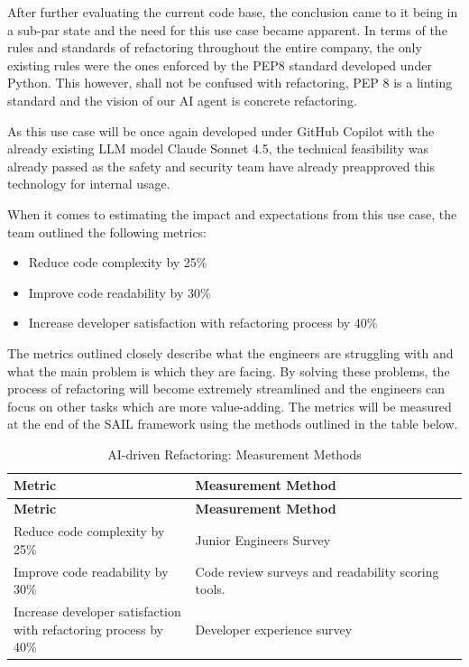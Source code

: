 \documentclass[]{imc-inf}
\def\tightlist{}
\begin{document}
After further evaluating the current code base, the conclusion came to it being in a sub-par state and the need for this use case became apparent. In terms of the rules and standards of refactoring throughout the entire company, the only existing rules were the ones enforced by the PEP8 standard developed under Python. This however, shall not be confused with refactoring, PEP 8 is a linting standard and the vision of our AI agent is concrete refactoring.

As this use case will be once again developed under GitHub Copilot with the already existing LLM model Claude Sonnet 4.5, the technical feasibility was already passed as the safety and security team have already preapproved this technology for internal usage.


When it comes to estimating the impact and expectations from this use case, the team outlined the following metrics:
\begin{itemize}
	\tightlist
	\item
	Reduce code complexity by 25\%
	\item
	Improve code readability by 30\%
	\item
	Increase developer satisfaction with refactoring process by 40\%
\end{itemize}

The metrics outlined closely describe what the engineers are struggling with and what the main problem is which they are facing. By solving these problems, the process of refactoring will become extremely streamlined and the engineers can focus on other tasks which are more value-adding. The metrics will be measured at the end of the SAIL framework using the methods outlined in the table below.

\begin{longtable}{|p{0.4\linewidth}|p{0.6\linewidth}|}
	\hline
	\textbf{Metric} & \textbf{Measurement Method} \\
	\hline
	\endfirsthead
	\hline
	\textbf{Metric} & \textbf{Measurement Method} \\
	\hline
	\endhead
	\hline
	\caption{AI-driven Refactoring: Measurement Methods}
	\label{tab:refactor_metrics}
	\endlastfoot
	
	Reduce code complexity by 25\% &
	Junior Engineers Survey \\
	\hline
	
	Improve code readability by 30\% &
	Code review surveys and readability scoring tools.\\
	\hline
	
	Increase developer satisfaction with refactoring process by 40\% &
	Developer experience survey \\
	\hline

\end{longtable}
\end{document}
